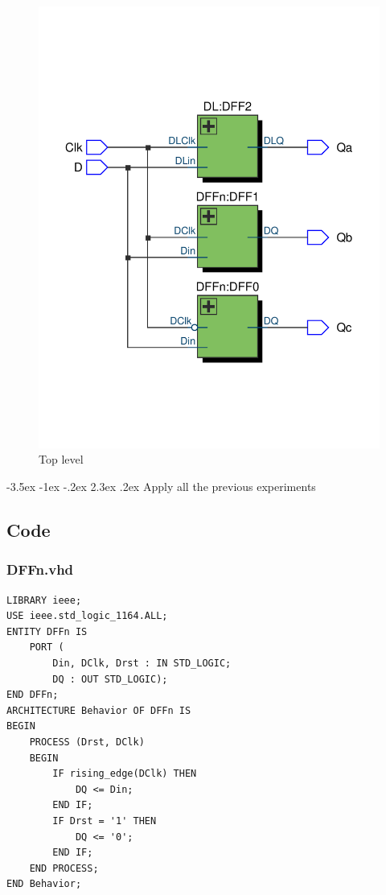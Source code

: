 \documentclass[13pt,a4paper]{report}
\makeatletter
\renewcommand\section{\@startsection {section}{1}{-1em}%
  {-3.5ex \@plus -1ex \@minus -.2ex}%
  {2.3ex \@plus.2ex}%
  {\normalfont\Large\bfseries}}
\makeatother
\begin{document}
\begin{figure}[H]
\centering
\includegraphics[scale=0.4, clip, trim={0cm 5cm 0cm 5cm}]{images/Exc5_RTL.pdf}
\caption*{Top level}
\end{figure}

\section{Apply all the previous experiments}

\subsection{Code}
\subsubsection{DFFn.vhd}
\begin{verbatim}
LIBRARY ieee;
USE ieee.std_logic_1164.ALL;
ENTITY DFFn IS
	PORT (
		Din, DClk, Drst : IN STD_LOGIC;
		DQ : OUT STD_LOGIC);
END DFFn;
ARCHITECTURE Behavior OF DFFn IS
BEGIN
	PROCESS (Drst, DClk)
	BEGIN
		IF rising_edge(DClk) THEN
			DQ <= Din;
		END IF;
		IF Drst = '1' THEN
			DQ <= '0';
		END IF;
	END PROCESS;
END Behavior;
\end{verbatim}
\end{document}
